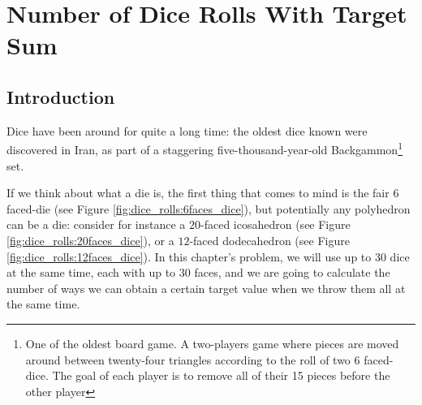%

\chapter{Number of Dice Rolls With Target Sum}
\label{ch:dice_rolls}
\section*{Introduction}

Dice have been around for quite a long time: the oldest dice known  were discovered in Iran, as part of a staggering five-thousand-year-old
 Backgammon\footnote{One of the oldest board game. A two-players game where pieces are moved around between twenty-four triangles according to the roll of two 6 faced-dice. The goal of each player is to remove all of their 15 pieces before the other player} set.

If we think about what a die is, the first thing that comes to mind is the fair $6$ faced-die (see Figure \ref{fig:dice_rolls:6faces_dice}), but potentially any polyhedron can be a die: consider for instance a  $20$-faced icosahedron (see Figure
\ref{fig:dice_rolls:20faces_dice}), or a $12$-faced dodecahedron (see Figure
\ref{fig:dice_rolls:12faces_dice}).
In this chapter's problem, we will use up to $30$ dice at the same time,
each with up to $30$ faces, and we are going to calculate the number of ways we can obtain a certain
target value when we throw them all at the same time.


